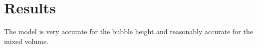 \documentclass[12pt]{beamer}
\begin{document}
\section{Results}
\begin{frame}[t]
The model is very accurate for the bubble height and reasonably accurate for the mixed volume.
\begin{center}

\end{center}
\end{frame}
\end{document}
